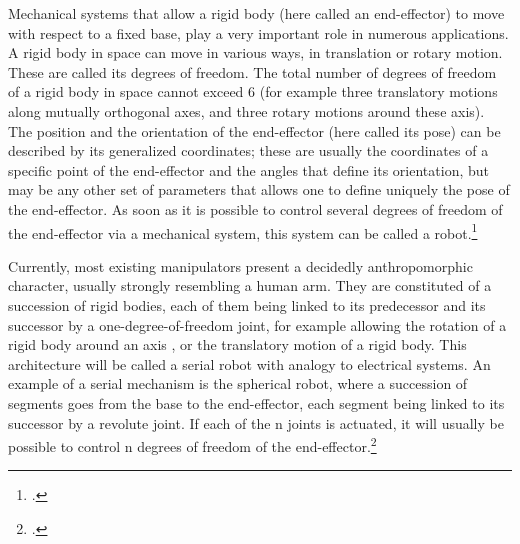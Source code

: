 \begin{em}
Mechanical systems that allow a rigid body (here called an end-effector)
to move with respect to a fixed base, play a very important role in numerous applications. A rigid body in space can move in various ways, in
translation or rotary motion. These are called its degrees of freedom. The
total number of degrees of freedom of a rigid body in space cannot exceed 6 (for example three translatory motions along mutually orthogonal
axes, and three rotary motions around these axis). The position and the
orientation of the end-effector (here called its pose) can be described by
its generalized coordinates; these are usually the coordinates of a specific
point of the end-effector and the angles that define its orientation, but may
be any other set of parameters that allows one to define uniquely the pose
of the end-effector. As soon as it is possible to control several degrees of
freedom of the end-effector via a mechanical system, this system can be
called a robot.\footcite[Vgl.][1]{Merlet2006}
\end{em}

\begin{em}
Currently, most existing manipulators present a decidedly anthropomorphic
character, usually strongly resembling a human arm. They are constituted
of a succession of rigid bodies, each of them being linked to its predecessor
and its successor by a one-degree-of-freedom joint, for example allowing
the rotation of a rigid body around an axis , or the translatory motion of a
rigid body. This architecture will be called a serial robot with analogy to
electrical systems. An example of a serial mechanism is the spherical robot,
where a succession of segments goes from the base to the end-effector, each
segment being linked to its successor by a revolute joint. If each of the n
joints is actuated, it will usually be possible to control n degrees of freedom of the end-effector.\footcite[Vgl.][1-2]{Merlet2006}
\end{em}

